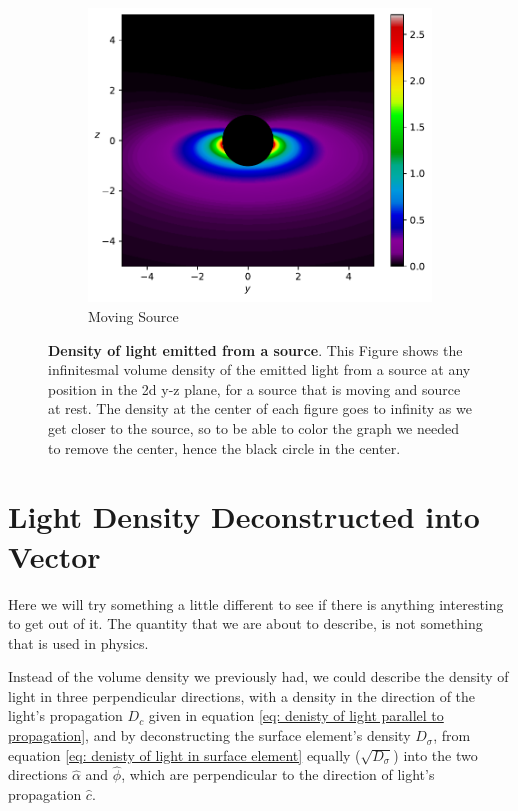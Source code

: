 \begin{figure}[H]
\begin{subfigure}{0.45\textwidth}
		\includegraphics[width=\textwidth]{images/pdf/Density_of_Light_from_Moving_Source.pdf}
		\caption{Moving Source}
		\label{subfig_2: Density of light for surface element}
	\end{subfigure}
	\caption{\textbf{Density of light emitted from a source}. This Figure shows the infinitesmal volume density of the emitted light from a source at any position in the 2d y-z plane, for a source that is moving and source at rest. The density at the center of each figure goes to infinity as we get closer to the source, so to be able to color the graph we needed to remove the center, hence the black circle in the center.}
	\label{fig: Density of light for surface element}
\end{figure}



\section{Light Density Deconstructed into Vector}\label{sect: Field Vector Density}

Here we will try something a little different to see if there is anything interesting to get out of it. The quantity that we are about to describe, is not something that is used in physics.

Instead of the volume density we previously had, we could describe the density of light in three perpendicular directions, with a density in the direction of the light's propagation $D_c$ given in equation \eqref{eq: denisty of light parallel to propagation}, and by deconstructing the surface element's density $D_\sigma$, from equation \eqref{eq: denisty of light in surface element} equally ($\sqrt{D_\sigma}$) into the two directions $\hat{\alpha}$ and $\hat{\phi}$, which are perpendicular to the direction of light's propagation $\hat{c}$.

